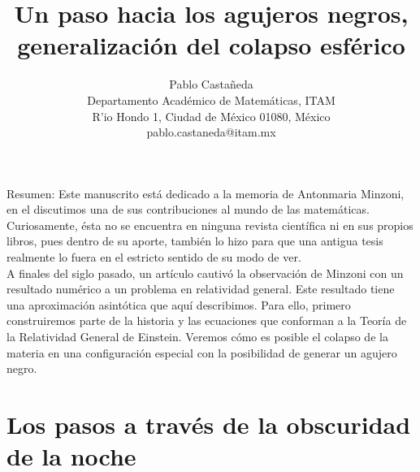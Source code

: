 \documentclass[12pt]{article}
\newenvironment{narrow}[2]{%
 \begin{list}{}{%
 \setlength{\topsep}{0pt}%
 \setlength{\leftmargin}{#1}%
 \setlength{\rightmargin}{#2}%
 \setlength{\listparindent}{\parindent}%
 \setlength{\itemindent}{\parindent}%
 \setlength{\parsep}{\parindent}}%
\item[]}{\end{list}}
\begin{document}
\title{Un paso hacia los agujeros negros, \\ generalización del colapso esférico}
\author{Pablo Casta\~neda
\\ \small Departamento Acad\'emico de Matem\'aticas, ITAM
\\ \small R\a'io Hondo 1, Ciudad de M\'exico 01080, M\'exico
\\ \small {\sf pablo.castaneda@itam.mx}}
\date{}

\maketitle


\vspace*{1ex}

\begin{narrow}{1cm}{1cm}
\noindent
{\sc Resumen:\;} Este manuscrito está dedicado a la memoria de Antonmaria Minzoni, en el discutimos una de sus contribuciones al mundo de las matemáticas. Curiosamente, ésta no se encuentra en ninguna revista científica ni en sus propios libros, pues dentro de su aporte, también lo hizo para que una antigua tesis realmente lo fuera en el estricto sentido de su modo de ver. \\ \indent
A finales del siglo pasado, un artículo cautivó la observación de Minzoni con un resultado numérico a un problema en relatividad general. Este resultado tiene una aproximación asintótica que aquí describimos. Para ello, primero construiremos parte de la historia y las ecuaciones que conforman a la Teoría de la Relatividad General de Einstein. Veremos cómo es posible el colapso de la materia en una configuración especial con la posibilidad de generar un agujero negro.
\end{narrow}





\section{Los pasos a través de la obscuridad de la noche}
\end{document}
